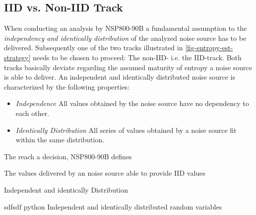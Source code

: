 \subsection{IID vs. Non-IID Track}\label{sub:iid-noniid-track}
When conducting an analysis by NSP800-90B a fundamental assumption to the \textit{independency and identically distribution} of the analyzed noise source has to be delivered. Subsequently one of the two tracks illustrated in \ref{fig-entropy-est-strategy} needs to be chosen to proceed: The non-IID- i.e. the IID-track. Both tracks basically deviate regarding the assumed maturity of entropy a noise source is able to deliver. An independent and identically distributed noise source is characterized by the following properties: 
\begin{itemize}
	\item \textit{Independence} All values obtained by the noise source have no dependency to each other.
		\item \textit{Identically Distribution} All series of values obtained by a noise source fit within the same distribution.
\end{itemize}
The reach a decision, NSP800-90B defines 

The values delivered by an noise source able to provide IID values


Independent and identically Distribution

 sdfsdf
 \gls{python}
Independent and identically distributed random variables


%
%
%












